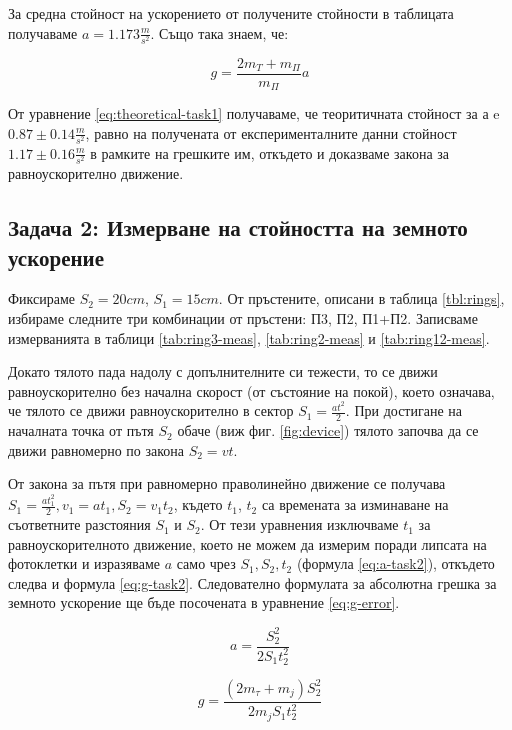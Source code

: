 \documentclass[12pt]{article}
\begin{document}
За средна стойност на ускорението от получените стойности в таблицата получаваме $a = 1.173 \frac{m}{s^2}$. Също така знаем, че:

\begin{equation}\label{eq:theoretical-task1}
    g = \frac{2m_T + m_\Pi}{m_\Pi} a   
\end{equation}

От уравнение \ref{eq:theoretical-task1} получаваме, че теоритичната стойност за а e $0.87 \pm 0.14 \frac{m}{s^2}$, равно на получената от експерименталните данни стойност $1.17 \pm 0.16 \frac{m}{s^2}$ в рамките на грешките им, откъдето и доказваме закона за равноускорително движение.


\subsection{Задача 2: Измерване на стойността на земното ускорение}
Фиксираме $S_2 = 20 cm$, $S_1 = 15 cm$. От пръстените, описани в таблица \ref{tbl:rings}, избираме следните три комбинации от пръстени: П3, П2, П1+П2. Записваме измерванията в таблици \ref{tab:ring3-meas}, \ref{tab:ring2-meas} и \ref{tab:ring12-meas}.

Докато тялото пада надолу с допълнителните си тежести, то се движи равноускорително без начална скорост (от състояние на покой), което означава, че тялото се движи равноускорително в сектор $S_1 = \frac{at^2}{2}$. При достигане на началната точка от пътя $S_2$ обаче (виж фиг. \ref{fig:device}) тялото започва да се движи равномерно по закона $S_2 = vt$.

От закона за пътя при равномерно праволинейно движение се получава $S_1 = \frac{at_1^2}{2}, v_1 = at_1, S_2 = v_1t_2$, където $t_1$, $t_2$ са времената за изминаване на съответните разстояния $S_1$ и $S_2$. От тези уравнения изключваме $t_1$ за равноускорителното движение, което не можем да измерим поради липсата на фотоклетки и изразяваме $a$ само чрез $S_1, S_2, t_2$ (формула \ref{eq:a-task2}), откъдето следва и формула \ref{eq:g-task2}. Следователно формулата за абсолютна грешка за земното ускорение ще бъде посочената в уравнение \ref{eq:g-error}.

\begin{equation}\label{eq:a-task2}
    a = \frac{S_2^2}{2S_1t_2^2}
\end{equation}

\begin{equation}\label{eq:g-task2}
g = \frac{(2m_\tau + m_j)S_2^2}{2m_jS_1t_2^2}    
\end{equation}
\end{document}
